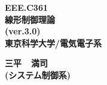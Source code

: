 \documentclass[a4paper,11pt]{jreport}
\def\mcnumber{EEE.C361}
\def\mctitle{線形制御理論}
\def\mcdept{東京科学大学/電気電子系}
\def\mcfname{三平}
\def\mcgname{満司 \\ \Large(システム制御系)}
\def\mcyear{(ver.3.0)}
\def\mcquoter{}
\begin{document}
%
%
%
%
%
%
%
%
%
%
%
%
%
%
%
%

\thispagestyle{empty}
\vspace*{5cm}
\begin{center}
 \bfseries {\LARGE \mcnumber }\\[0.5cm]
 \bfseries {\Huge \mctitle }\\[0.5cm]
 \bfseries {\LARGE \mcyear}\\[0.5cm]
\vspace*{0.5cm}
 \bfseries {\LARGE \mcdept}\\[0.3cm]
 \bfseries {\LARGE \mcquoter}
\end{center}
\vspace*{7cm}
\begin{center}
 \Huge \bfseries  \mcfname \ \ \mcgname
\end{center}

\renewcommand{\thepage}{\roman{page}}  %

\tableofcontents{-1cm}

\newpage  %

\setcounter{page}{1}  %
\renewcommand{\thepage}{\arabic{page}}  %

\appendix

%
\end{document}
